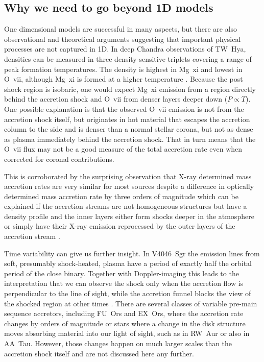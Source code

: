 \documentclass[graybox, nosecnum]{svmult}
\begin{document}
\subsection{Why we need to go beyond 1D models}
One dimensional models are successful in many aspects, but there are also observational and theoretical arguments suggesting that important physical processes are not captured in 1D. In deep Chandra observations of TW~Hya, densities can be measured in three density-sensitive triplets covering a range of peak formation temperatures. The density is highest in Mg~{\sc xi} and lowest in O~{\sc vii}, although Mg~{\sc xi} is formed at a higher temperature \cite{Brickhouse_2010}. Because the post shock region is isobaric, one would expect Mg~{\sc xi} emission from a region directly behind the accretion shock and O~{\sc vii} from denser layers deeper down ($P\propto T$). One possible explanation is that the observed O~{\sc vii} emission is not from the accretion shock itself, but originates in hot material that escapes the accretion column to the side and is denser than a normal stellar corona, but not as dense as plasma immediately behind the accretion shock. That in turn means that the O~{\sc vii} flux may not be a good measure of the total accretion rate even when corrected for coronal contributions.

This is corroborated by the surprising observation that X-ray determined mass accretion rates are very similar for most sources despite a difference in optically determined mass accretion rate by three orders of magnitude \cite{2011A&A...526A.104C} which can be explained if the accretion streams are not homogeneous structures but have a density profile and the inner layers either form shocks deeper in the atmosphere or simply have their X-ray emission reprocessed by the outer layers of the accretion stream \cite{Sacco_2010,Schneider_2018,2021Natur.597...41E}.

Time variability can give us further insight. In V4046~Sgr the emission lines from soft, presumably shock-heated, plasma have a period of exactly half the orbital period of the close binary. Together with Doppler-imaging this leads to the interpretation that we can observe the shock only when the accretion flow is perpendicular to the line of sight, while the accretion funnel blocks the view of the shocked region at other times \cite{2012ApJ...752..100A}. 
There are several classes of variable pre-main sequence accretors, including FU~Ors and EX~Ors, where the accretion rate changes by orders of magnitude or stars where a change in the disk structure moves absorbing material into our light of sight, such as in RW~Aur or also in AA~Tau. However, those changes happen on much larger scales than the accretion shock itself and are not discussed here any further.
\end{document}
